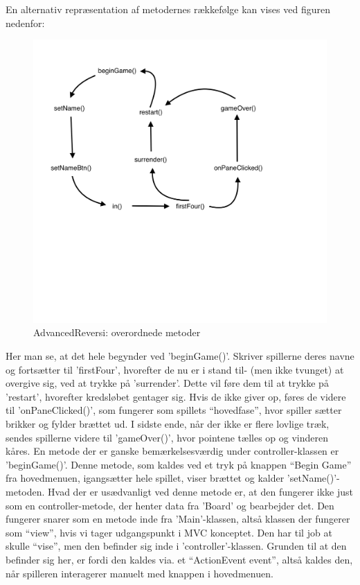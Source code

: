 En alternativ repræsentation af metodernes rækkefølge kan vises ved figuren nedenfor:
\begin{figure}[H]
    \centering
    \caption{AdvancedReversi: overordnede metoder}\label{ARF}
    \includegraphics[width=1\textwidth]{Graphics/Screenshot 2023-01-20 at 16.35.36.png}
\end{figure}
Her man se, at det hele begynder ved 'beginGame()'. Skriver spillerne deres navne og fortsætter til 'firstFour', hvorefter de nu er i stand til- (men ikke tvunget) at overgive sig, ved at trykke på 'surrender'. Dette vil føre dem til at trykke på 'restart', hvorefter kredsløbet gentager sig. Hvis de ikke giver op, føres de videre til 'onPaneClicked()', som fungerer som spillets ``hovedfase'', hvor spiller sætter brikker og fylder brættet ud. I sidste ende, når der ikke er flere lovlige træk, sendes spillerne videre til 'gameOver()', hvor pointene tælles op og vinderen kåres.\newline
En metode der er ganske bemærkelsesværdig under controller-klassen er 'beginGame()'. Denne metode, som kaldes ved et tryk på knappen ``Begin Game'' fra hovedmenuen, igangsætter hele spillet, viser brættet og kalder 'setName()'-metoden. Hvad der er usædvanligt ved denne metode er, at den fungerer ikke just som en controller-metode, der henter data fra 'Board' og bearbejder det. Den fungerer snarer som en metode inde fra 'Main'-klassen, altså klassen der fungerer som ``view'', hvis vi tager udgangspunkt i MVC konceptet. Den har til job at skulle ``vise'', men den befinder sig inde i 'controller'-klassen. Grunden til at den befinder sig her, er fordi den kaldes via. et ``ActionEvent event'', altså kaldes den, når spilleren interagerer manuelt med knappen i hovedmenuen.
